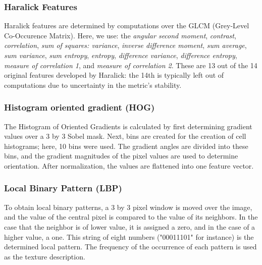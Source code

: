 
\subsubsection{Haralick Features}

Haralick features \cite{Haralick_1973} are determined by computations over the GLCM (Grey-Level Co-Occurence Matrix). Here, we use: the \emph{angular second moment}, \emph{contrast}, \emph{correlation}, \emph{sum of squares: variance}, \emph{inverse difference moment}, \emph{sum average}, \emph{sum variance}, \emph{sum entropy}, \emph{entropy}, \emph{difference variance}, \emph{difference entropy}, \emph{measure of correlation 1}, and \emph{measure of correlation 2}. These are 13 out of the 14 original features developed by Haralick: the 14th is typically left out of computations due to uncertainty in the metric's stability. 

\subsubsection{Histogram oriented gradient (HOG)}

The Histogram of Oriented Gradients is calculated by first determining gradient values over a 3 by 3 Sobel mask. Next, bins are created for the creation of cell histograms; here, 10 bins were used. The gradient angles are divided into these bins, and the gradient magnitudes of the pixel values are used to determine orientation. After normalization, the values are flattened into one feature vector. 

\subsubsection{Local Binary Pattern (LBP)}

To obtain local binary patterns, a 3 by 3 pixel window is moved over the image, and the value of the central pixel is compared to the value of its neighbors. In the case that the neighbor is of lower value, it is assigned a zero, and in the case of a higher value, a one. This string of eight numbers ("00011101" for instance) is the determined local pattern. The frequency of the occurrence of each pattern is used as the texture description. 
  
  

  
  
  
  
  
  
  